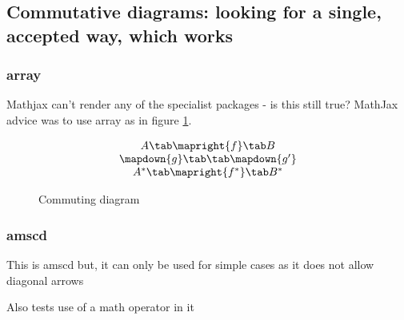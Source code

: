 \documentclass[12pt,a4paper]{article}
\newcommand{\PICalt}[1]{{#1}}
\theoremstyle{clearprint}
\newcommand{\End}{\mathrm{End}}
\begin{document}
\subsection[Commutative diagrams]{Commutative diagrams: looking for a single, accepted way, which works}
\setcounter{equation}{0}

\subsubsection[array]{array}

Mathjax can't render any of the specialist packages - is this still true? MathJax advice was to use array as in figure \ref{commute}. %

\begin{figure}[!hp]
\PICalt{\begin{equation*}
\begin{array}{ccc}
 A\tab \mapright{f} \tab B \\
 \mapdown{g} \tab \tab \mapdown{g'} \\
 A^* \tab \mapright{f^*} \tab B^*
\end{array}
\end{equation*}}
\caption{Commuting diagram}\label{commute}
\end{figure}

\subsubsection{amscd}

This is amscd but, it can only be used for simple cases as it does not allow diagonal arrows

Also tests use of a math operator in it
\CDalt{\[\begin{CD}
S^{\mathcal{W}_\Lambda}\otimes T @>j>> T\\
@VVV @VV{\End P}V\\
(S\otimes T)/I @= (Z\otimes T)/J
\end{CD}
\]}

\end{document}
